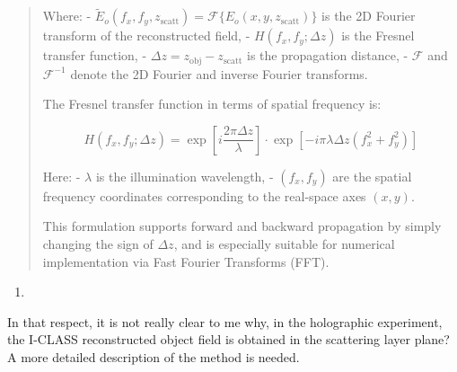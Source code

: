 \documentclass[12pt]{article}
\newenvironment{solved_reviewercomment}
    {\begin{tcolorbox}[width=\linewidth,colback=gray!5,colframe=solved_commentcolor!50,title=Reviewer Comment,left=5pt,right=5pt]}
    {\end{tcolorbox}}
\newenvironment{finished_ourresponse}
    {\begin{tcolorbox}[width=\linewidth,breakable,enhanced,colback=gray!5,colframe=finished_responsecolor!50,title=Response,left=5pt,right=5pt]}
    {\end{tcolorbox}}
\begin{document}
\begin{finished_ourresponse}
\begin{quote}
{        Where:
        - $ \tilde{E}_o(f_x, f_y, z_{\text{scatt}}) = \mathcal{F}\{ E_o(x, y, z_{\text{scatt}}) \} $ is the 2D Fourier transform of the reconstructed field,
        - $ H(f_x, f_y; \Delta z) $ is the Fresnel transfer function,
        - $ \Delta z = z_{\text{obj}} - z_{\text{scatt}} $ is the propagation distance,
        - $ \mathcal{F} $ and $ \mathcal{F}^{-1} $ denote the 2D Fourier and inverse Fourier transforms.
        
        The Fresnel transfer function in terms of spatial frequency is:
        
        \begin{equation}
            H(f_x, f_y; \Delta z) = \exp\left[ i \frac{2\pi \Delta z}{\lambda} \right] \cdot \exp\left[ -i \pi \lambda \Delta z (f_x^2 + f_y^2) \right]
        \end{equation}
        
        Here:
        - $ \lambda $ is the illumination wavelength,
        - $ (f_x, f_y) $ are the spatial frequency coordinates corresponding to the real-space axes $ (x, y) $.
        
        This formulation supports forward and backward propagation by simply changing the sign of $ \Delta z $, and is especially suitable for numerical implementation via Fast Fourier Transforms (FFT).}
        
    \end{quote}

            
\end{finished_ourresponse}


    
\begin{enumerate}[label=\arabic*., resume]
\item \leavevmode
\end{enumerate}
\vspace{-1em}
\begin{solved_reviewercomment}
    In that respect, it is not really clear to me why, in the holographic experiment, the I-CLASS reconstructed object field is obtained in the scattering layer plane? A more detailed description of the method is needed.
\end{solved_reviewercomment}
\end{document}
